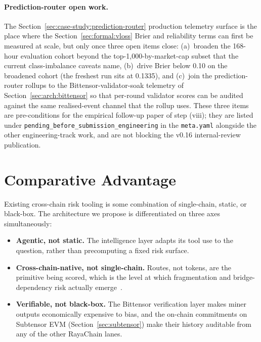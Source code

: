 \documentclass[11pt,a4paper]{article}
\begin{document}
\paragraph{Prediction-router open work.} The Section~\ref{sec:case-study:prediction-router}
production telemetry surface is the place where the
Section~\ref{sec:formal:vloss} Brier and reliability terms can first be
measured at scale, but only once three open items close: (a)~broaden the 168-hour
evaluation cohort beyond the top-1{,}000-by-market-cap subset that the current
class-imbalance caveats name, (b)~drive Brier below 0.10 on the broadened
cohort (the freshest run sits at 0.1335), and (c)~join the prediction-router
rollups to the Bittensor-validator-soak telemetry of
Section~\ref{sec:arch:bittensor} so that per-round validator scores can be
audited against the same realised-event channel that the rollup uses. These
three items are pre-conditions for the empirical follow-up paper of step
(viii); they are listed under \texttt{pending\_before\_submission\_engineering}
in the \texttt{meta.yaml} alongside the other engineering-track work, and are
not blocking the v0.16 internal-review publication.

\section{Comparative Advantage}\label{sec:compare}

Existing cross-chain risk tooling is some combination of single-chain, static, or
black-box. The architecture we propose is differentiated on three axes simultaneously:
\begin{itemize}
  \item \textbf{Agentic, not static.} The intelligence layer adapts its tool use to the
        question, rather than precomputing a fixed risk surface.
  \item \textbf{Cross-chain-native, not single-chain.} Routes, not tokens, are the
        primitive being scored, which is the level at which fragmentation and
        bridge-dependency risk actually emerge~\cite{gogol2024liquidity,
        zhang2023sok}.
  \item \textbf{Verifiable, not black-box.} The Bittensor verification layer makes
        miner outputs economically expensive to bias, and the on-chain commitments on
        Subtensor EVM (Section~\ref{sec:subtensor}) make their history auditable from
        any of the other RayaChain lanes.
\end{itemize}
\end{document}
